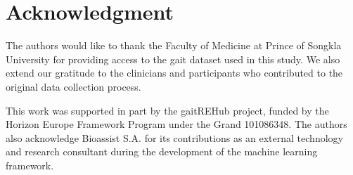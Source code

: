 \section{Acknowledgment}
\label{sec:acknowledgment}
The authors would like to thank the Faculty of Medicine at Prince of Songkla University for providing access to the gait dataset used in this study.
We also extend our gratitude to the clinicians and participants who contributed to the original data collection process.

This work was supported in part by the gaitREHub project, funded by the Horizon Europe Framework Program under the Grand 101086348.
The authors also acknowledge Bioassist S.A. for its contributions as an external technology and research consultant during the development 
of the machine learning framework.
